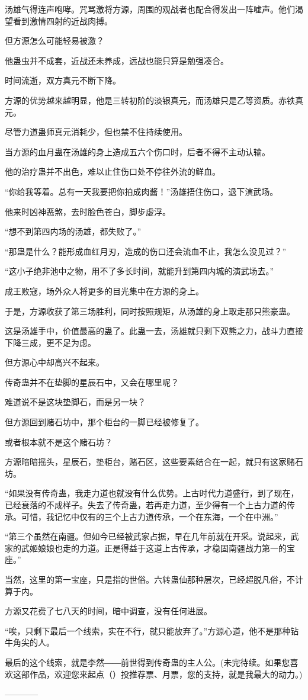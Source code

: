 \begin{this_body}
汤雄气得连声咆哮。咒骂激将方源，周围的观战者也配合得发出一阵嘘声。他们渴望看到激情四射的近战肉搏。

但方源怎么可能轻易被激？

他蛊虫并不成套，近战还未养成，远战也能只算是勉强凑合。

时间流逝，双方真元不断下降。

方源的优势越来越明显，他是三转初阶的淡银真元，而汤雄只是乙等资质。赤铁真元。

尽管力道蛊师真元消耗少，但也禁不住持续使用。

当方源的血月蛊在汤雄的身上造成五六个伤口时，后者不得不主动认输。

他的治疗蛊并不出色，难以止住伤口处不停往外流的鲜血。

“你给我等着。总有一天我要把你拍成肉酱！”汤雄捂住伤口，退下演武场。

他来时凶神恶煞，去时脸色苍白，脚步虚浮。

“想不到第四内场的汤雄，都失败了。”

“那蛊是什么？能形成血红月刃，造成的伤口还会流血不止，我怎么没见过？”

“这小子绝非池中之物，用不了多长时间，就能升到第四内城的演武场去。”

成王败寇，场外众人将更多的目光集中在方源的身上。

于是，方源收获了第三场胜利，同时按照规矩，从汤雄的身上取走那只熊豪蛊。

这是汤雄手中，价值最高的蛊了。此蛊一去，汤雄就只剩下双熊之力，战斗力直接下降三成，更不足为虑。

但方源心中却高兴不起来。

传奇蛊并不在垫脚的星辰石中，又会在哪里呢？

难道说不是这块垫脚石，而是另一块？

但方源回到赌石坊中，那个柜台的一脚已经被修复了。

或者根本就不是这个赌石坊？

方源暗暗摇头，星辰石，垫柜台，赌石区，这些要素结合在一起，就只有这家赌石坊。

“如果没有传奇蛊，我走力道也就没有什么优势。上古时代力道盛行，到了现在，已经衰落的不成样子。失去了传奇蛊，若再走力道，至少得有一个上古力道的传承。可惜，我记忆中仅有的三个上古力道传承，一个在东海，一个在中洲。”

“第三个虽然在南疆。但如今已经被武家占据，早在几年前就在开采。说起来，武家的武姬娘娘也走的力道。正是得益于这道上古传承，才稳固南疆战力第一的宝座。”

当然，这里的第一宝座，只是指的世俗。六转蛊仙那种层次，已经超脱凡俗，不计算于内。

方源又花费了七八天的时间，暗中调查，没有任何进展。

“唉，只剩下最后一个线索，实在不行，就只能放弃了。”方源心道，他不是那种钻牛角尖的人。

最后的这个线索，就是李然――前世得到传奇蛊的主人公。(未完待续。如果您喜欢这部作品，欢迎您来起点（）投推荐票、月票，您的支持，就是我最大的动力。)

------------

\end{this_body}

